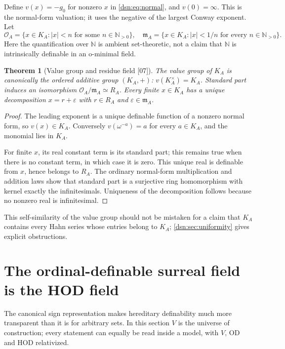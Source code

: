\documentclass[11pt,a4paper]{article}
\numberwithin{equation}{section}
\newtheorem{theorem}{Theorem}[section]
\theoremstyle{definition}
\theoremstyle{remark}
\newcommand{\OD}{\mathrm{OD}}
\newcommand{\HOD}{\mathrm{HOD}}
\newcommand{\N}{\mathbb N}
\newcommand{\src}[1]{\textup{\textsf{\small[#1]}}}
\begin{document}
Define $v(x)=-g_0$ for nonzero $x$ in \eqref{dsn:eq:normal}, and
$v(0)=\infty$. This is the normal-form valuation; it uses the negative of
the largest Conway exponent. Let
\[
 \mathcal O_A=\{x\in K_A:|x|<n\text{ for some }n\in\N_{>0}\},\quad
 \mathfrak m_A=\{x\in K_A:|x|<1/n\text{ for every }n\in\N_{>0}\}.
\]
Here the quantification over $\N$ is ambient set-theoretic, not a claim
that $\N$ is intrinsically definable in an o-minimal field.

\begin{theorem}[Value group and residue field \src{07}]\label{dsn:thm:valuation}
The value group of $K_A$ is canonically the ordered additive group
$(K_A,+)$: $v(K_A^\times)=K_A$. Standard part induces an isomorphism
$\mathcal O_A/\mathfrak m_A\simeq R_A$. Every finite $x\in K_A$ has a
unique decomposition $x=r+\varepsilon$ with $r\in R_A$ and
$\varepsilon\in\mathfrak m_A$.
\end{theorem}
\begin{proof}
The leading exponent is a unique definable function of a nonzero normal
form, so $v(x)\in K_A$. Conversely $v(\omega^{-a})=a$ for every $a\in K_A$,
and the monomial lies in $K_A$.

For finite $x$, its real constant term is its standard part; this remains
true when there is no constant term, in which case it is zero. This unique
real is definable from $x$, hence belongs to $R_A$. The ordinary
normal-form multiplication and addition laws show that standard part is a
surjective ring homomorphism with kernel exactly the infinitesimals.
Uniqueness of the decomposition follows because no nonzero real is
infinitesimal.
\end{proof}

This self-similarity of the value group should not be mistaken for a claim
that $K_A$ contains every Hahn series whose entries belong to $K_A$;
\cref{dsn:sec:uniformity} gives explicit obstructions.

\section{The ordinal-definable surreal field is the HOD field}
\label{dsn:sec:HOD}

The canonical sign representation makes hereditary definability much
more transparent than it is for arbitrary sets. In this section $V$ is the
universe of construction; every statement can equally be read inside a
model, with $V$, $\OD$ and $\HOD$ relativized.
\end{document}
